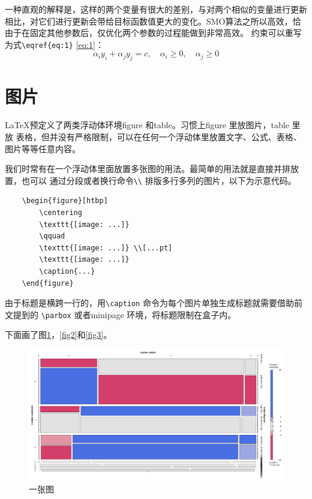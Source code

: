 \documentclass{ctexart}
\theoremstyle{plain} 		     %
\theoremstyle{definition} 		 %
\theoremstyle{remark} 			 %
\begin{document}
一种直观的解释是，这样的两个变量有很大的差别，与对两个相似的变量进行更新相比，对它们进行更新会带给目标函数值更大的变化。SMO算法之所以高效，恰由于在固定其他参数后，仅优化两个参数的过程能做到非常高效。
约束可以重写为式\verb|\eqref{eq:1}| \eqref{eq:1}：
\begin{equation}
	\alpha _i y_i+\alpha _j y_j = c,\quad \alpha _i\geqslant 0,\quad \alpha _j\geqslant 0
	\label{eq:1}
\end{equation}

\section{图片} \label{sec:fig}
\LaTeX 预定义了两类浮动体环境figure 和table。习惯上figure 里放图片，table 里放
表格，但并没有严格限制，可以在任何一个浮动体里放置文字、公式、表格、图片等等任意内容。

我们时常有在一个浮动体里面放置多张图的用法。最简单的用法就是直接并排放置，也可以
通过分段或者换行命令\verb|\\| 排版多行多列的图片，以下为示意代码。
\begin{verbatim}
	\begin{figure}[htbp]
		\centering
		\texttt{[image: ...]}
		\qquad
		\texttt{[image: ...]} \\[...pt]
		\texttt{[image: ...]}
		\caption{...}
	\end{figure}
\end{verbatim}

由于标题是横跨一行的，用\verb|\caption| 命令为每个图片单独生成标题就需要借助前文提到的
\verb|\parbox| 或者minipage 环境，将标题限制在盒子内。

下面画了图\ref{fig1}，\ref{fig2}和\ref{fig3}。
\begin{figure}[htbp]
	\centering
	\includegraphics[width=1\textwidth]{fig1}
	\caption{一张图}
	\label{fig1}
\end{figure}
\end{document}

